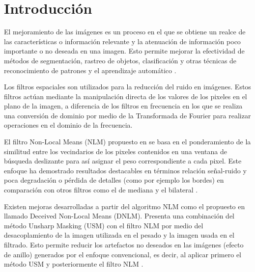 
\chapter{Introducción}
\label{chp:intro}

El mejoramiento de las im\'agenes es un proceso en el que se obtiene un realce de las caracter\'isticas o informaci\'on relevante y la atenuaci\'on de informaci\'on poco importante o no deseada en una imagen. Esto permite mejorar la efectividad de m\'etodos de segmentaci\'on, rastreo de objetos, clasificaci\'on y otras t\'ecnicas de reconocimiento de patrones y el aprendizaje autom\'atico \cite{BF2014,IMPROVESEGMENTATIONBF,CONCAPAN2016}. 

Los filtros espaciales son utilizados para la reducci\'on del ruido en im\'agenes. Estos filtros act\'uan mediante la manipulaci\'on directa de los valores de los pixeles en el plano de la imagen, a diferencia de los filtros en frecuencia en los que se realiza una conversi\'on de dominio por medio de la Transformada de Fourier para realizar operaciones en el dominio de la frecuencia.

El filtro Non-Local Means (NLM) propuesto en \cite{buades2005non} se basa en el ponderamiento de la similitud entre los vecindarios de los pixeles contenidos en una ventana de búsqueda deslizante para as\'i asignar el peso correspondiente a cada pixel. Este enfoque ha demostrado resultados destacables en t\'erminos relaci\'on se\~nal-ruido y poca degradaci\'on o p\'erdida de detalles (como por ejemplo los bordes) en comparaci\'on con otros filtros como el de mediana y el bilateral \cite{CONCAPAN2016}. 

Existen mejoras desarrolladas a partir del algoritmo NLM como el propuesto en \cite{calderon2015dewaff} llamado Deceived Non-Local Means (DNLM). Presenta una combinaci\'on del m\'etodo Unsharp Masking (USM) con el filtro NLM por medio del desacoplamiento de la imagen utilizada en el pesado y la imagen usada en el filtrado. Esto permite reducir los artefactos no deseados en las im\'agenes (efecto de anillo) generados por el enfoque convencional, es decir, al aplicar primero el m\'etodo USM y posteriormente el filtro NLM \cite{calderon2015dewaff}.  

